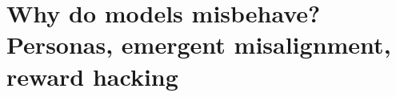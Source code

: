 \chapter{Why do models misbehave? Personas, emergent misalignment, reward hacking}\label{ch:L7}

\renewcommand{\theLVIIres}{P\arabic{LVIIres}}
\newcommand{\LVIIstmt}[1]{\par\medskip\noindent\refstepcounter{LVIIres}{\headsf\bfseries\color{amber!80!black}Proposition~\theLVIIres}\enspace(#1).\enspace\itshape}
\newcommand{\LVIIproof}{\par\smallskip\upshape\noindent{\headsf\color{slate}Proof.}\enspace}
\newcommand{\LVIIqed}{\hfill\qedsymbol\par\smallskip}

